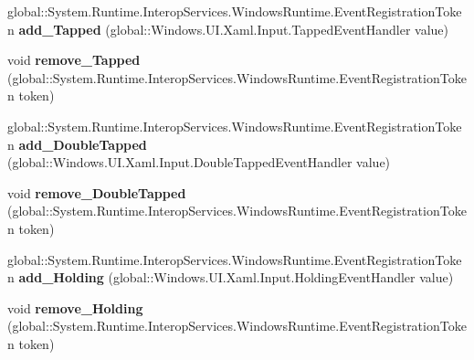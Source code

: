\begin{DoxyCompactItemize}
\mbox{\label{interface_windows_1_1_u_i_1_1_xaml_1_1_i_u_i_element_a991022bdcf7af68dd9c2bf3964b3bb14}} 
global\+::\+System.\+Runtime.\+Interop\+Services.\+Windows\+Runtime.\+Event\+Registration\+Token {\bfseries add\+\_\+\+Tapped} (global\+::\+Windows.\+U\+I.\+Xaml.\+Input.\+Tapped\+Event\+Handler value)
\item 
\mbox{\label{interface_windows_1_1_u_i_1_1_xaml_1_1_i_u_i_element_a10d8b2df3301a8687ac2a02dbf56e6ad}} 
void {\bfseries remove\+\_\+\+Tapped} (global\+::\+System.\+Runtime.\+Interop\+Services.\+Windows\+Runtime.\+Event\+Registration\+Token token)
\item 
\mbox{\label{interface_windows_1_1_u_i_1_1_xaml_1_1_i_u_i_element_a236a917ea08d09ceea39e12f03cbe17f}} 
global\+::\+System.\+Runtime.\+Interop\+Services.\+Windows\+Runtime.\+Event\+Registration\+Token {\bfseries add\+\_\+\+Double\+Tapped} (global\+::\+Windows.\+U\+I.\+Xaml.\+Input.\+Double\+Tapped\+Event\+Handler value)
\item 
\mbox{\label{interface_windows_1_1_u_i_1_1_xaml_1_1_i_u_i_element_ab7e8271e8ceb0cc5ca0b7bb3423f726f}} 
void {\bfseries remove\+\_\+\+Double\+Tapped} (global\+::\+System.\+Runtime.\+Interop\+Services.\+Windows\+Runtime.\+Event\+Registration\+Token token)
\item 
\mbox{\label{interface_windows_1_1_u_i_1_1_xaml_1_1_i_u_i_element_aa8c0e6b4397f0226baab3ec71083abba}} 
global\+::\+System.\+Runtime.\+Interop\+Services.\+Windows\+Runtime.\+Event\+Registration\+Token {\bfseries add\+\_\+\+Holding} (global\+::\+Windows.\+U\+I.\+Xaml.\+Input.\+Holding\+Event\+Handler value)
\item 
\mbox{\label{interface_windows_1_1_u_i_1_1_xaml_1_1_i_u_i_element_a731b5111082558a2945d799084cfbd79}} 
void {\bfseries remove\+\_\+\+Holding} (global\+::\+System.\+Runtime.\+Interop\+Services.\+Windows\+Runtime.\+Event\+Registration\+Token token)
\item 
\mbox{\label{interface_windows_1_1_u_i_1_1_xaml_1_1_i_u_i_element_ae3a5c2e71c2ae0d8a2d7ce2beb34673e}} 

\end{DoxyCompactItemize}
